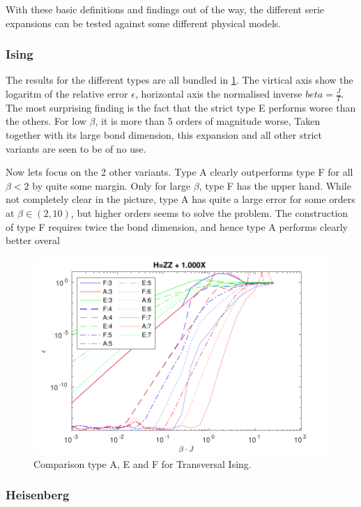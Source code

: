 With these basic definitions and findings out of the way, the different serie expansions can be tested against some different physical models.

\subsubsection{Ising}

The results for the different types are all bundled in \cref{fig:benchmark:tising}. The virtical axis show the logaritm of the relative error $\epsilon$, horizontal axis the normalised inverse $beta= \frac{J}{T}$. The most surprising finding is the fact that the strict type E performs worse than the others. For low $\beta$, it is more than 5 orders of magnitude worse, Taken together with its large bond dimension, this expansion  and all other strict variants are seen to be of no use.

Now lets focus on the 2 other variants. Type A clearly outperforms type F for all $\beta<2$ by quite some margin. Only for large $\beta$, type F has the upper hand. While not completely clear in the picture, type A has quite a large error for some orders at $\beta \in (2,10) $, but higher orders seems to solve the problem. The construction of type F requires twice the bond dimension, and hence type A performs clearly better overal

\begin{figure}
  \center
  \includegraphics[width=\textwidth]{Figuren/benchmarking/t_ising.pdf}
  \caption{Comparison type A, E and F for Transversal Ising. }
  \label{fig:benchmark:tising}
\end{figure}

\subsubsection{Heisenberg}

